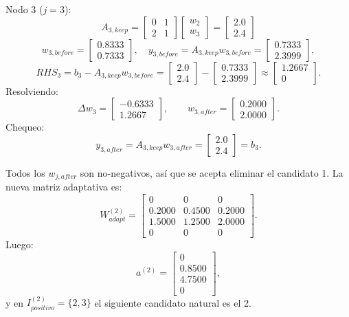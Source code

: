 \documentclass[11pt,a4paper]{article}
\begin{document}
Nodo 3 ($j=3$):
\[
A_{3,keep}=
\begin{bmatrix}
0&1\\
2&1
\end{bmatrix}
\begin{bmatrix}
w_2\\w_3
\end{bmatrix}
=
\begin{bmatrix}
2.0\\2.4
\end{bmatrix}
\]
\[
w_{3,before}=
\begin{bmatrix}
0.8333\\0.7333
\end{bmatrix},
\quad
y_{3,before}=A_{3,keep}w_{3,before}=
\begin{bmatrix}
0.7333\\2.3999
\end{bmatrix},
\]
\[
RHS_3=b_3-A_{3,keep}w_{3,before}
=
\begin{bmatrix}
2.0\\2.4
\end{bmatrix}
-
\begin{bmatrix}
0.7333\\2.3999
\end{bmatrix}
\approx
\begin{bmatrix}
1.2667\\0
\end{bmatrix}.
\]
Resolviendo:
\[
\Delta w_3=
\begin{bmatrix}
-0.6333\\1.2667
\end{bmatrix},
\qquad
w_{3,after}=
\begin{bmatrix}
0.2000\\2.0000
\end{bmatrix}.
\]
Chequeo:
\[
y_{3,after}=A_{3,keep}w_{3,after}
=
\begin{bmatrix}
2.0\\2.4
\end{bmatrix}
=b_3.
\]

Todos los $w_{j,after}$ son no-negativos, así que se acepta eliminar el candidato 1.
La nueva matriz adaptativa es:
\[
W_{adapt}^{(2)}=
\begin{bmatrix}
0&0&0\\
0.2000&0.4500&0.2000\\
1.5000&1.2500&2.0000\\
0&0&0
\end{bmatrix}.
\]
Luego:
\[
a^{(2)}=
\begin{bmatrix}
0\\0.8500\\4.7500\\0
\end{bmatrix},
\]
y en $I_{positivo}^{(2)}=\{2,3\}$ el siguiente candidato natural es el 2.
\end{document}
